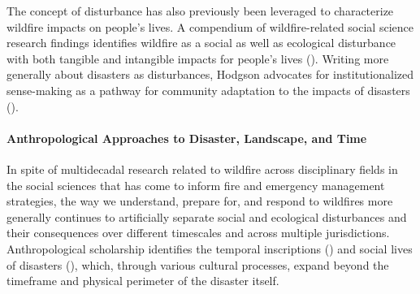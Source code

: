 \documentclass[
]{article}
\begin{document}
The concept of disturbance has also previously been leveraged to characterize wildfire impacts on people's lives. A compendium of wildfire-related social science research findings identifies wildfire as a social as well as ecological disturbance with both tangible and intangible impacts for people's lives (). Writing more generally about disasters as disturbances, Hodgson advocates for institutionalized sense-making as a pathway for community adaptation to the impacts of disasters ().

\paragraph{Anthropological Approaches to Disaster, Landscape, and Time}\label{anthropological-approaches-to-disaster-landscape-and-time-1}

In spite of multidecadal research related to wildfire across disciplinary fields in the social sciences that has come to inform fire and emergency management strategies, the way we understand, prepare for, and respond to wildfires more generally continues to artificially separate social and ecological disturbances and their consequences over different timescales and across multiple jurisdictions. Anthropological scholarship identifies the temporal inscriptions () and social lives of disasters (), which, through various cultural processes, expand beyond the timeframe and physical perimeter of the disaster itself.
\end{document}
